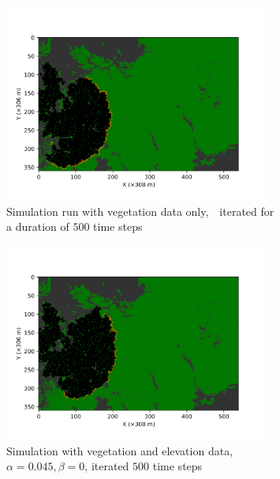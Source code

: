 \begin{figure}[H]
  \centering
  \begin{subfigure}[t]{0.47\textwidth}
    \includegraphics[width=0.95\textwidth]{Figures/LastFrame_01.jpg}
    \caption{Simulation run with vegetation data only, \,\, iterated for a duration of $500$ time steps}
    \label{fig:vegeOnly}
  \end{subfigure}
  \begin{subfigure}[t]{0.47\textwidth}
    \includegraphics[width=0.95\textwidth]{Figures/LastFrame_02.jpg}
    \caption{Simulation with vegetation and elevation data, $\alpha=0.045, \beta = 0$, iterated $500$ time steps}
    \label{fig:vegePlusEle}
  \end{subfigure}
  \begin{subfigure}[t]{0.47\textwidth}

\end{subfigure}
\end{figure}
